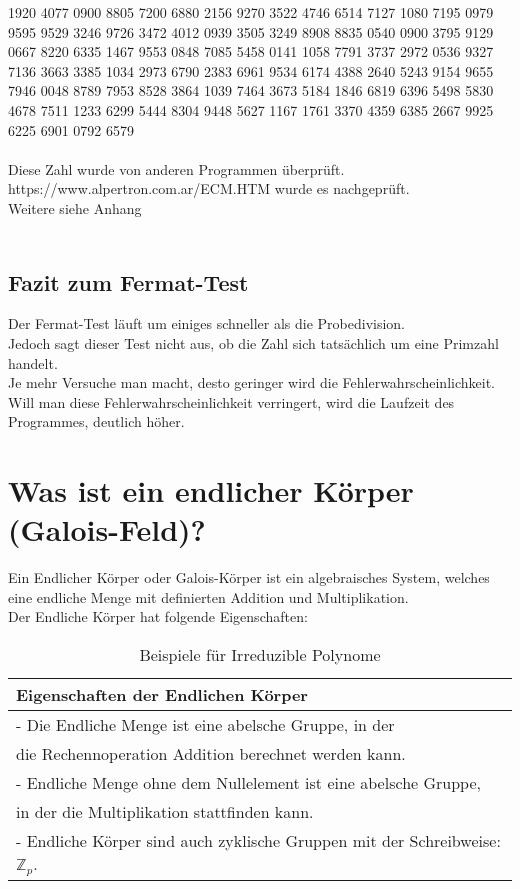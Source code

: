 1920 4077 0900 8805 7200
6880 2156 9270 3522 4746
6514 7127 1080 7195 0979
9595 9529 3246 9726 3472
4012 0939 3505 3249 8908
8835 0540 0900 3795 9129
0667 8220 6335 1467 9553
0848 7085 5458 0141 1058
7791 3737 2972 0536 9327
7136 3663 3385 1034 2973
6790 2383 6961 9534 6174
4388 2640 5243 9154 9655
7946 0048 8789 7953 8528
3864 1039 7464 3673 5184
1846 6819 6396 5498 5830
4678 7511 1233 6299 5444
8304 9448 5627 1167 1761
3370 4359 6385 2667 9925
6225 6901 0792 6579 
\\
\\
Diese Zahl wurde von anderen Programmen überprüft. https://www.alpertron.com.ar/ECM.HTM wurde es nachgeprüft.
\\
Weitere siehe Anhang\\
\\
\subsection*{Fazit zum Fermat-Test}

Der Fermat-Test läuft um einiges schneller als die Probedivision.\\
Jedoch sagt dieser Test nicht aus, ob die Zahl sich tatsächlich um eine Primzahl handelt.\\
Je mehr Versuche man macht, desto geringer wird die Fehlerwahrscheinlichkeit. \\
Will man diese Fehlerwahrscheinlichkeit verringert, wird die Laufzeit des Programmes, deutlich höher.  \\


\newpage
\section{Was ist ein endlicher Körper (Galois-Feld)?}

Ein Endlicher Körper oder Galois-Körper ist ein algebraisches System, welches eine endliche Menge mit definierten Addition und Multiplikation.\\
Der Endliche Körper hat folgende Eigenschaften:


\begin{table}[!ht]
    \centering
        \begin{tabular}{l}
            \toprule
            \textbf{Eigenschaften der Endlichen Körper}\\
            \midrule
            - Die Endliche Menge ist eine abelsche Gruppe, in der \\
            die Rechennoperation Addition berechnet werden kann.\\
            - Endliche Menge ohne dem Nullelement ist eine abelsche Gruppe, \\
            in der die Multiplikation stattfinden kann.\\
            - Endliche Körper sind auch zyklische Gruppen mit der Schreibweise: $ \mathbb{Z}_p $. \\
           \bottomrule
        \end{tabular}
        \caption{Beispiele für Irreduzible Polynome}
        \label{tab3}
    \end{table}


